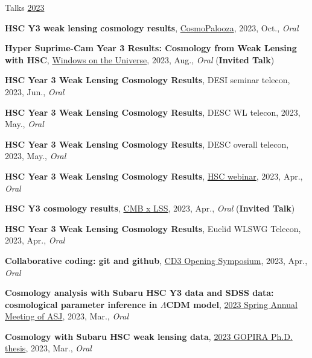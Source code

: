 \begin{rSection}{Talks}
\underline{2023}
\begin{etaremune}
\setcounter{enumi}{35}
\item \textbf{HSC Y3 weak lensing cosmology results}, \href{https://cosmopalooza.lbl.gov/}{CosmoPalooza}, 2023, Oct., \textit{Oral}
\item \textbf{Hyper Suprime-Cam Year 3 Results: Cosmology from Weak Lensing with HSC}, \href{http://vietnam.in2p3.fr/2023/windows/index.html}{Windows on the Universe}, 2023, Aug., \textit{Oral} (\textbf{Invited Talk})
\item \textbf{HSC Year 3 Weak Lensing Cosmology Results}, DESI seminar telecon, 2023, Jun., \textit{Oral}
\item \textbf{HSC Year 3 Weak Lensing Cosmology Results}, DESC WL telecon, 2023, May., \textit{Oral}
\item \textbf{HSC Year 3 Weak Lensing Cosmology Results}, DESC overall telecon, 2023, May., \textit{Oral}
\item \textbf{HSC Year 3 Weak Lensing Cosmology Results}, \href{https://hsc-release.mtk.nao.ac.jp/doc/index.php/wly3/}{HSC webinar}, 2023, Apr., \textit{Oral}
\item \textbf{HSC Y3 cosmology results}, \href{https://www2.yukawa.kyoto-u.ac.jp/~cmb-lss/index.php}{CMB x LSS}, 2023, Apr., \textit{Oral} (\textbf{Invited Talk})
\item \textbf{HSC Year 3 Weak Lensing Cosmology Results}, Euclid WLSWG Telecon, 2023, Apr., \textit{Oral}
\item \textbf{Collaborative coding: git and github}, \href{https://cd3.ipmu.jp/opening/}{CD3 Opening Symposium}, 2023, Apr., \textit{Oral}
\item \textbf{Cosmology analysis with Subaru HSC Y3 data and SDSS data: cosmological parameter inference in $\Lambda$CDM model}, \href{https://www.asj.or.jp/nenkai/archive/2023a/pdf/U20a.pdf}{2023 Spring Annual Meeting of ASJ}, 2023, Mar., \textit{Oral}
\item \textbf{Cosmology with Subaru HSC weak lensing data}, \href{http://gopira.jp/Dthesis2022/program.html}{2023 GOPIRA Ph.D. thesis}, 2023, Mar., \textit{Oral}
\end{etaremune}


\end{rSection}

